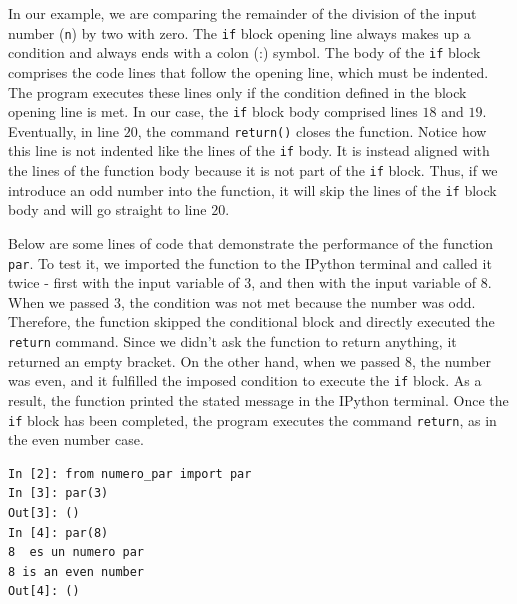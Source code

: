 \begin{paracol}{2}
In our example, we are comparing the remainder of the division of the input number (\texttt{n}) by two with zero. The \texttt{if} block opening line always makes up a condition and always ends with a colon (:) symbol. The body of the \texttt{if} block comprises the code lines that follow the opening line, which must be indented. The program executes these lines only if the condition defined in the block opening line is met. In our case, the \texttt{if} block body comprised lines $18$ and $19$. Eventually, in line $20$, the command \texttt{return()} closes the function. Notice how this line is not indented like the lines of the \texttt{if} body. It is instead aligned with the lines of the function body because it is not part of the \texttt{if} block. Thus, if we introduce an odd number into the function, it will skip the lines of the \texttt{if}
block body and will go straight to line $20$.

Below are some lines of code that demonstrate the performance of the function \texttt{par}. To test it, we imported the function to the IPython terminal and called it twice - first with the input variable of 3, and then with the input variable of 8. When we passed 3, the condition was not met because the number was odd. Therefore, the function skipped the conditional block and directly executed the \texttt{return} command. Since we didn't ask the function to return anything, it returned an empty bracket. On the other hand, when we passed 8, the number was even, and it fulfilled the imposed condition to execute the \texttt{if} block. As a result, the function printed the stated message in the IPython terminal. Once the \texttt{if} block has been completed, the program executes the command \texttt{return}, as in the even number case.

\end{paracol}

\begin{center}
    \begin{minipage}{.4\textwidth}
\begin{verbatim}
In [2]: from numero_par import par
In [3]: par(3)
Out[3]: ()
In [4]: par(8)
8  es un numero par
8 is an even number
Out[4]: ()
\end{verbatim}
\end{minipage}
\end{center}

